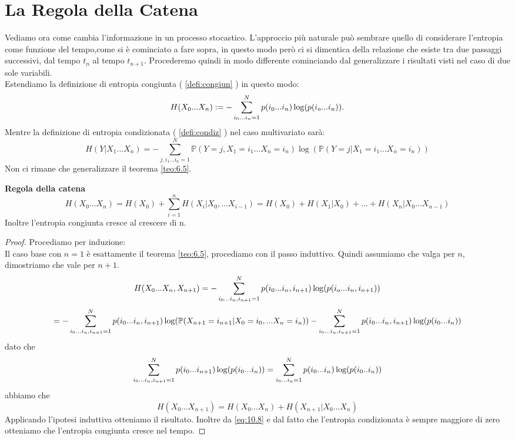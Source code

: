 \vspace{15pt}


\section{La Regola della Catena}
\label{sec:chainRule}
\vspace{10pt}

Vediamo ora come cambia l'informazione in un processo stocastico. L'approccio più naturale può sembrare quello di considerare l'entropia come funzione del tempo,come si è cominciato a fare sopra, in questo modo però ci si dimentica della relazione che esiste tra due passaggi successivi, dal tempo $t_n$ al tempo $t_{n+1}$. Procederemo quindi in modo differente cominciando dal generalizzare i risultati visti nel caso di due sole variabili.\\
Estendiamo la definizione di entropia congiunta ( \ref{defi:congiun} ) in questo modo:
\begin{equation}
H(X_0...X_n):=- \sum_{i_0...i_n=1}^N p(i_0...i_n) \log(p(i_o...i_n)).
\end{equation}
Mentre la definizione di entropia condizionata ( \ref{defi:condiz} ) nel caso multivariato sarà:
\begin{equation}
H(Y|X_1...X_n)=-\sum_{j,i_1...i_n=1}^N \mathbb{P}(Y=j,X_1=i_1...X_n=i_n) \log(\mathbb{P}(Y=j|X_1=i_1...X_n=i_n))
\end{equation}
Non ci rimane che generalizzare il teorema \ref{teo:6.5}.
\begin{teo} \label{teo:chainRule}
\textbf{Regola della catena}
\begin{equation}
H(X_0...X_n)=H(X_0)+\sum_{i=1}^n  H(X_i|X_0,...X_{i-1})=H(X_0)+H(X_1|X_0)+...+H(X_n|X_0...X_{n-1})
\end{equation}
Inoltre l'entropia congiunta cresce al crescere di n.
\end{teo}
\begin{proof}
Procediamo per induzione:\\
Il caso base con $n=1$ è esattamente il teorema \ref{teo:6.5}, procediamo con il passo induttivo. Quindi assumiamo che valga per $n$, dimostriamo che vale per $n+1$.
$$H(X_0...X_n, X_{n+1})=- \sum_{i_0...i_n,i_{n+1}=1}^N p(i_0...i_n,i_{n+1}) \log(p(i_o...i_n,i_{n+1}))$$
$$= - \sum_{i_0...i_n,i_{n+1}=1}^N p(i_0...i_n,i_{n+1}) \log(\mathbb{P}(X_{n+1}=i_{n+1}|X_0=i_0,...X_n=i_n))-\sum_{i_0...i_n,i_{n+1}=1}^N p(i_0...i_n,i_{n+1}) \log(p(i_0...i_n))$$
dato che 
$$\sum_{i_0...i_n,i_{n+1}=1}^N p(i_0...i_{n+1}) \log(p(i_0...i_n))=\sum_{i_0...i_n=1}^N p(i_0...i_{n}) \log(p(i_0..i_n))$$
abbiamo che
\begin{equation}\label{eq:10.8}
H(X_0...X_{n+1})=H(X_0...X_n)+H(X_{n+1}|X_0...X_n)
\end{equation}
Applicando l'ipotesi induttiva otteniamo il risultato.
Inoltre da \ref{eq:10.8} e dal fatto che l'entropia condizionata è sempre maggiore di zero otteniamo che l'entropia congiunta cresce nel tempo.
\end{proof}

